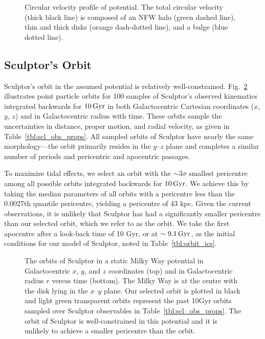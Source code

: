 \begin{figure}
\centering
{}
\caption[Circular velocity of the Milky Way potential]{Circular velocity
profile of \citet{EP2020} potential. The total circular velocity (thick
black line) is composed of an NFW halo (green dashed line), thin and
thick \citet{miyamoto+nagai1975} disks (orange dash-dotted line), and a
\citet{hernquist1990} bulge (blue dotted
line).}\label{fig:v_circ_potential}
\end{figure}

\subsection{Sculptor's Orbit}\label{sec:scl_smallperi}

Sculptor's orbit in the assumed potential is relatively
well-constrained. Fig.~\ref{fig:scl_orbits} illustrates point particle
orbits for 100 samples of Sculptor's observed kinematics integrated
backwards for \(10\,{\rm Gyr}\) in both Galactocentric Cartesian coordinates
(\(x\), \(y\), \(z\)) and in Galactocentric radius with time. These
orbits sample the uncertainties in distance, proper motion, and radial
velocity, as given in Table~\ref{tbl:scl_obs_props}. All sampled orbits
of Sculptor have nearly the same morphology---the orbit primarily
resides in the \(y\)--\(z\) plane and completes a similar number of
periods and pericentric and apocentric passages.

To maximize tidal effects, we select an orbit with the \(\sim 3\sigma\)
smallest pericentre among all possible orbits integrated backwards for
\(10\,{\rm Gyr}\). We achieve this by taking the median parameters of all
orbits with a pericentre less than the 0.0027th quantile pericentre,
yielding a pericentre of 43 kpc. Given the current observations, it is
unlikely that Sculptor has had a significantly smaller pericentre than
our selected orbit, which we refer to as the \smallperi{} orbit. We take
the first apocentre after a look-back time of 10 Gyr, or at
\(\sim9.1\,{\rm Gyr}\), as the initial conditions for our model of Sculptor,
noted in Table~\ref{tbl:orbit_ics}.

\begin{figure}
\centering
{}
\caption[Sculptor's possible orbits]{The orbits of Sculptor in a static
Milky Way potential in Galactocentric \(x\), \(y\), and \(z\)
coordinates (top) and in Galactocentric radius \(r\) versus time
(bottom). The Milky Way is at the centre with the disk lying in the
\(x\)--\(y\) plane. Our selected \smallperi{} orbit is plotted in black
and light green transparent orbits represent the past 10Gyr orbits
sampled over Sculptor observables in Table~\ref{tbl:scl_obs_props}. The
orbit of Sculptor is well-constrained in this potential and it is
unlikely to achieve a smaller pericentre than the \smallperi{}
orbit.}\label{fig:scl_orbits}
\end{figure}

